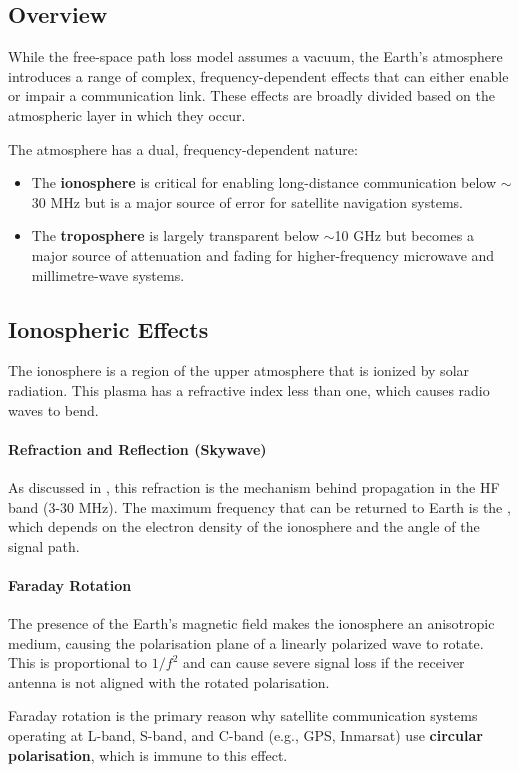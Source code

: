 \subsection{Overview}

While the free-space path loss model assumes a vacuum, the Earth's atmosphere introduces a range of complex, frequency-dependent effects that can either enable or impair a communication link. These effects are broadly divided based on the atmospheric layer in which they occur.

\begin{keyconcept}
    The atmosphere has a dual, frequency-dependent nature:
    \begin{itemize}
        \item The \textbf{ionosphere} is critical for enabling long-distance communication below $\sim$30 MHz but is a major source of error for satellite navigation systems.
        \item The \textbf{troposphere} is largely transparent below $\sim$10 GHz but becomes a major source of attenuation and fading for higher-frequency microwave and millimetre-wave systems.
    \end{itemize}
\end{keyconcept}


\subsection{Ionospheric Effects}

The ionosphere is a region of the upper atmosphere that is ionized by solar radiation. This plasma has a refractive index less than one, which causes radio waves to bend.

\paragraph{Refraction and Reflection (Skywave)}
As discussed in , this refraction is the mechanism behind  propagation in the HF band (3-30 MHz). The maximum frequency that can be returned to Earth is the , which depends on the electron density of the ionosphere and the angle of the signal path.

\paragraph{Faraday Rotation}
The presence of the Earth's magnetic field makes the ionosphere an anisotropic medium, causing the polarisation plane of a linearly polarized wave to rotate. This  is proportional to $1/f^2$ and can cause severe signal loss if the receiver antenna is not aligned with the rotated polarisation.
\begin{warningbox}
    Faraday rotation is the primary reason why satellite communication systems operating at L-band, S-band, and C-band (e.g., GPS, Inmarsat) use \textbf{circular polarisation}, which is immune to this effect.
\end{warningbox}

